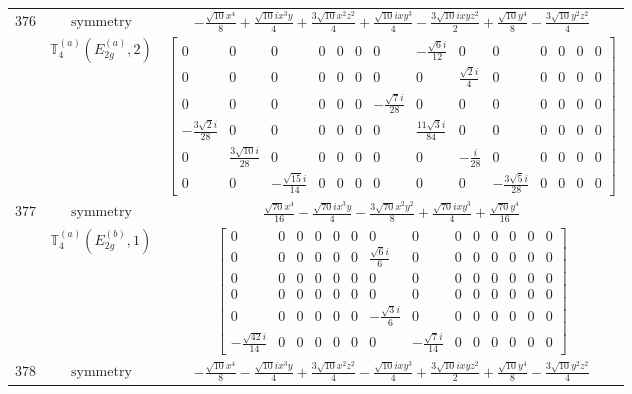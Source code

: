 \documentclass[fleqn,8pt,landscape]{jsarticle}
\begin{document}
\begin{longtable}{ccc}
$ 376 $ & $ \text{symmetry} $ & $ - \frac{\sqrt{10} x^{4}}{8} + \frac{\sqrt{10} i x^{3} y}{4} + \frac{3 \sqrt{10} x^{2} z^{2}}{4} + \frac{\sqrt{10} i x y^{3}}{4} - \frac{3 \sqrt{10} i x y z^{2}}{2} + \frac{\sqrt{10} y^{4}}{8} - \frac{3 \sqrt{10} y^{2} z^{2}}{4} $ \\
$  $ & $ \mathbb{T}_{4}^{(a)}(E_{2g}^{(a)},2) $ & $ \begin{bmatrix} 0 & 0 & 0 & 0 & 0 & 0 & 0 & - \frac{\sqrt{6} i}{12} & 0 & 0 & 0 & 0 & 0 & 0 \\ 0 & 0 & 0 & 0 & 0 & 0 & 0 & 0 & \frac{\sqrt{2} i}{4} & 0 & 0 & 0 & 0 & 0 \\ 0 & 0 & 0 & 0 & 0 & 0 & - \frac{\sqrt{7} i}{28} & 0 & 0 & 0 & 0 & 0 & 0 & 0 \\ - \frac{3 \sqrt{2} i}{28} & 0 & 0 & 0 & 0 & 0 & 0 & \frac{11 \sqrt{3} i}{84} & 0 & 0 & 0 & 0 & 0 & 0 \\ 0 & \frac{3 \sqrt{10} i}{28} & 0 & 0 & 0 & 0 & 0 & 0 & - \frac{i}{28} & 0 & 0 & 0 & 0 & 0 \\ 0 & 0 & - \frac{\sqrt{15} i}{14} & 0 & 0 & 0 & 0 & 0 & 0 & - \frac{3 \sqrt{5} i}{28} & 0 & 0 & 0 & 0 \end{bmatrix} $ \\ \hline
$ 377 $ & $ \text{symmetry} $ & $ \frac{\sqrt{70} x^{4}}{16} - \frac{\sqrt{70} i x^{3} y}{4} - \frac{3 \sqrt{70} x^{2} y^{2}}{8} + \frac{\sqrt{70} i x y^{3}}{4} + \frac{\sqrt{70} y^{4}}{16} $ \\
$  $ & $ \mathbb{T}_{4}^{(a)}(E_{2g}^{(b)},1) $ & $ \begin{bmatrix} 0 & 0 & 0 & 0 & 0 & 0 & 0 & 0 & 0 & 0 & 0 & 0 & 0 & 0 \\ 0 & 0 & 0 & 0 & 0 & 0 & \frac{\sqrt{6} i}{6} & 0 & 0 & 0 & 0 & 0 & 0 & 0 \\ 0 & 0 & 0 & 0 & 0 & 0 & 0 & 0 & 0 & 0 & 0 & 0 & 0 & 0 \\ 0 & 0 & 0 & 0 & 0 & 0 & 0 & 0 & 0 & 0 & 0 & 0 & 0 & 0 \\ 0 & 0 & 0 & 0 & 0 & 0 & - \frac{\sqrt{3} i}{6} & 0 & 0 & 0 & 0 & 0 & 0 & 0 \\ - \frac{\sqrt{42} i}{14} & 0 & 0 & 0 & 0 & 0 & 0 & - \frac{\sqrt{7} i}{14} & 0 & 0 & 0 & 0 & 0 & 0 \end{bmatrix} $ \\ \hline
$ 378 $ & $ \text{symmetry} $ & $ - \frac{\sqrt{10} x^{4}}{8} - \frac{\sqrt{10} i x^{3} y}{4} + \frac{3 \sqrt{10} x^{2} z^{2}}{4} - \frac{\sqrt{10} i x y^{3}}{4} + \frac{3 \sqrt{10} i x y z^{2}}{2} + \frac{\sqrt{10} y^{4}}{8} - \frac{3 \sqrt{10} y^{2} z^{2}}{4} $ \\

\end{longtable}
\end{document}
